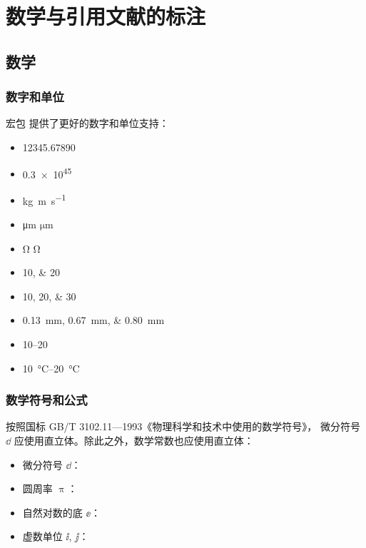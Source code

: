
\chapter{数学与引用文献的标注}

\section{数学}

\subsection{数字和单位}

宏包  提供了更好的数字和单位支持：
\begin{itemize}
  \item \num{12345.67890}
  \item \num{.3e45}
  \item \si{kg.m.s^{-1}}
  \item \si{\micro\meter} $\si{\micro\meter}$
  \item \si{\ohm} $\si{\ohm}$
  \item \numlist{10;20}
  \item \numlist{10;20;30}
  \item \SIlist{0.13;0.67;0.80}{\milli\metre}
  \item \numrange{10}{20}
  \item \SIrange{10}{20}{\degreeCelsius}
\end{itemize}

\subsection{数学符号和公式}

按照国标 GB/T 3102.11—1993《物理科学和技术中使用的数学符号》，
微分符号 $\dd$ 应使用直立体。除此之外，数学常数也应使用直立体：
\begin{itemize}
  \item 微分符号 $\dd$：
  \item 圆周率 $\uppi$：
  \item 自然对数的底 $\ee$：
  \item 虚数单位 $\ii$, $\jj$： 
\end{itemize}

